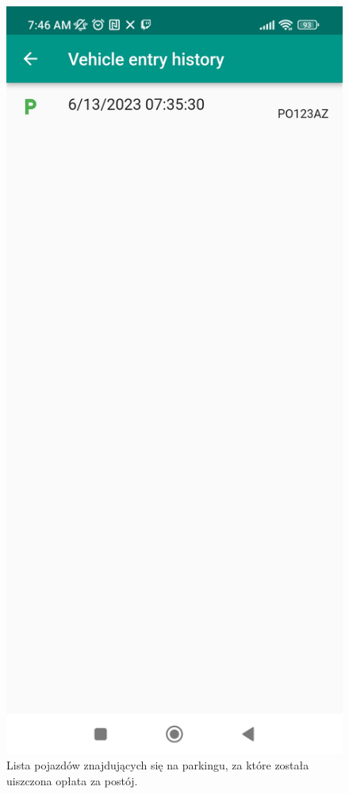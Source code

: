 \documentclass[a4paper, 11pt]{article}
\begin{document}
\begin{figure}
\begin{center}
\includegraphics[width=0.6\linewidth]{oplacony.jpg}
\caption{Lista pojazdów znajdujących się na parkingu, za które została uiszczona opłata za postój.}
\end{center}
\end{figure}
\end{document}
